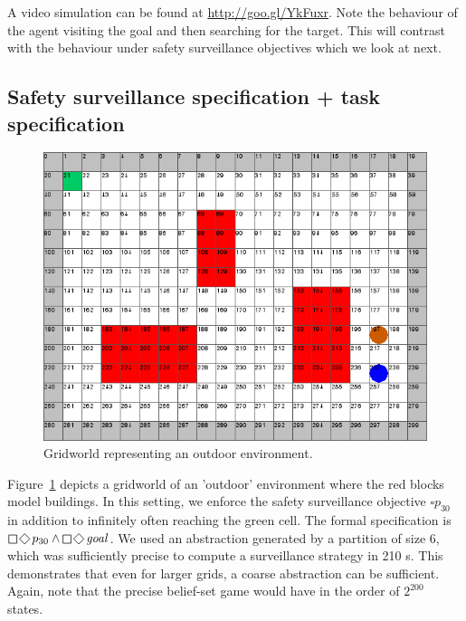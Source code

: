 
A video simulation can be found at \url{http://goo.gl/YkFuxr}. Note the behaviour of the agent visiting the goal and then searching for the target. This will contrast with the behaviour under safety surveillance objectives which we look at next.

\subsection{Safety surveillance specification + task specification}
\begin{figure}
\centering
\includegraphics[scale=0.2]{case2.png}\caption{Gridworld representing an outdoor environment.}\label{fig:case2}
\vspace{-.5cm}
\end{figure}
Figure~\ref{fig:case2} depicts a gridworld of an 'outdoor' environment where the red blocks model buildings. 
In this setting, we enforce the safety surveillance objective $\square p_{30}$ in addition to infinitely often reaching the green cell. The formal specification is $\LTLglobally\LTLfinally p_{30} \wedge \LTLglobally\LTLfinally \mathit{goal}$. 
We used an abstraction generated by a partition of size 6, which was sufficiently precise to compute a surveillance strategy in 210 s. This demonstrates that even for larger grids, a coarse abstraction can be sufficient. Again, note that the precise belief-set game would have in the order of $2^{200}$ states.
 
